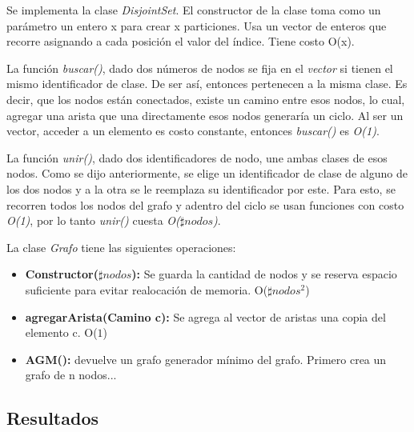 \quad Se implementa la clase \textit{DisjointSet}. El constructor de la clase toma como un par\'ametro un entero x para crear x particiones. Usa un vector de enteros que recorre asignando a cada posici\'on el valor del \'indice. Tiene costo O(x).

\quad La funci\'on \textit{buscar()}, dado dos n\'umeros de nodos se fija en el \textit{vector} si tienen el mismo identificador de clase. De ser as\'i, entonces pertenecen a la misma clase. Es decir, que los nodos est\'an conectados, existe un camino entre esos nodos, lo cual, agregar una arista que una 
directamente esos nodos generar\'ia un ciclo. Al ser un vector, acceder a un elemento es costo constante, entonces \textit{buscar()} es \textit{O(1)}.

\quad La funci\'on \textit{unir()}, dado dos identificadores de nodo, une ambas clases de esos nodos. Como se dijo anteriormente, se elige un identificador de clase de alguno de los dos nodos y a la otra se le reemplaza su identificador por este. Para esto, se recorren todos los nodos del grafo y adentro del ciclo se usan funciones con costo \textit{O(1)}, por lo tanto \textit{unir()} cuesta \textit{O($ \sharp nodos $)}. 


\quad La clase \textit{Grafo} tiene las siguientes operaciones:

\begin{itemize}
\item \textbf{Constructor($ \sharp nodos $):} Se guarda la cantidad de nodos y se reserva espacio suficiente para evitar realocaci\'on de memoria. O($ \sharp nodos^{2} $)


\item \textbf{agregarArista(Camino c):} Se agrega al vector de aristas una copia del elemento c. O($ 1 $)

\item \textbf{AGM():} devuelve un grafo generador m\'inimo del grafo. Primero crea un grafo de n nodos...

\end{itemize}


\subsection{Resultados}

